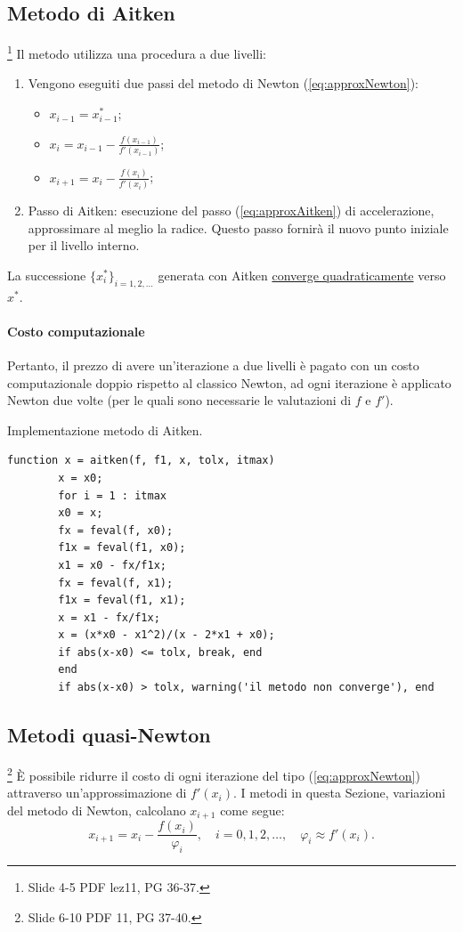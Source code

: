 \subsection{Metodo di Aitken}
\footnote{Slide 4-5 PDF lez11, PG 36-37.}
Il metodo utilizza una procedura a due livelli:
\begin{enumerate}
	\item Vengono eseguiti due passi del metodo di Newton (\ref{eq:approxNewton}): 
	\begin{itemize}
		\item $x_{i-1}=x_{i-1}^*$;
		\item $x_i=x_{i-1}-\frac{f(x_{i-1})}{f'(x_{i-1})}$;
		\item $x_{i+1}=x_i-\frac{f(x_i)}{f'(x_i)}$;
	\end{itemize}
	\item Passo di Aitken: esecuzione del passo (\ref{eq:approxAitken}) di accelerazione, approssimare al meglio la radice. Questo passo fornirà il nuovo punto iniziale per il livello interno.
\end{enumerate}
La successione $\{x_i^*\}_{i=1,2,\hdots}$ generata con Aitken \underline{converge quadraticamente} verso $x^*$.
\paragraph{Costo computazionale} Pertanto, il prezzo di avere un'iterazione a due livelli è pagato con un costo computazionale doppio rispetto al classico Newton, ad ogni iterazione è applicato Newton due volte (per le quali sono necessarie le valutazioni di $f$ e $f'$).

\begin{algorithm}
	\caption{Implementazione metodo di Aitken.}\label{alg:metAit}
	\begin{lstlisting}[style=Matlab-editor]
		function x = aitken(f, f1, x, tolx, itmax)
		x = x0;
		for i = 1 : itmax
		x0 = x;
		fx = feval(f, x0);
		f1x = feval(f1, x0);
		x1 = x0 - fx/f1x;
		fx = feval(f, x1);
		f1x = feval(f1, x1);
		x = x1 - fx/f1x;
		x = (x*x0 - x1^2)/(x - 2*x1 + x0);
		if abs(x-x0) <= tolx, break, end
		end
		if abs(x-x0) > tolx, warning('il metodo non converge'), end
	\end{lstlisting}
\end{algorithm}

\subsection{Metodi quasi-Newton}
\footnote{Slide 6-10 PDF 11, PG 37-40.}
È possibile ridurre il costo di ogni iterazione del tipo (\ref{eq:approxNewton}) attraverso un'approssimazione di $f'(x_i)$. I metodi in questa Sezione, variazioni del metodo di Newton, calcolano $x_{i+1}$ come segue:
\begin{equation}\label{eq:approxQuasiNewton}
	x_{i+1}=x_i-\frac{f(x_i)}{\varphi_i}, \quad i=0,1,2,\hdots, \quad\varphi_i\approx f'(x_i).
\end{equation}

